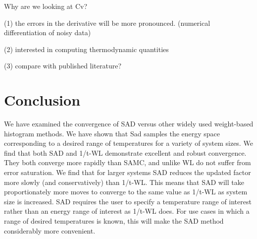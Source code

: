 \documentclass[letterpaper,twocolumn,amsmath,amssymb,pre,aps,10pt]{revtex4-1}
\begin{document}
Why are we looking at Cv?

(1) the errors in the derivative will be more pronounced. (numerical differentiation of noisy data)

(2) interested in computing thermodynamic quantities

(3) compare with published literature?


\section{Conclusion}
We have examined the convergence of SAD versus other widely used weight-based
histogram methods.  We have shown that Sad samples the energy space
corresponding to a desired range of temperatures for a variety of system sizes.
We find that both SAD and 1/t-WL demonstrate excellent and robust convergence.
They both converge more rapidly than SAMC, and unlike WL do not suffer from
error saturation. We find that for larger systems SAD reduces the updated factor
more slowly (and conservatively) than 1/t-WL. This means that SAD will take
proportionately more moves to converge to the same value as 1/t-WL as system
size is increased. SAD requires the user to specify a temperature range of
interest rather than an energy range of interest as 1/t-WL does. For use cases
in which a range of desired temperatures is known, this will make the SAD method
considerably more convenient.

\end{document}
